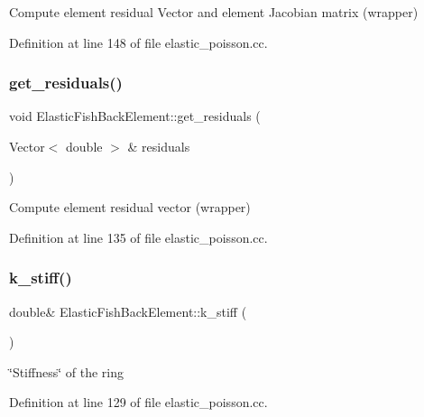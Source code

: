 Compute element residual Vector and element Jacobian matrix (wrapper) 



Definition at line 148 of file elastic\+\_\+poisson.\+cc.

\mbox{\label{classElasticFishBackElement_aed5858c2ae86823017713d0894cc4052}} 
\subsubsection{\texorpdfstring{get\+\_\+residuals()}{get\_residuals()}}
{\footnotesize\ttfamily void Elastic\+Fish\+Back\+Element\+::get\+\_\+residuals (\begin{DoxyParamCaption}\item[{Vector$<$ double $>$ \&}]{residuals }\end{DoxyParamCaption})\hspace{0.3cm}{\ttfamily [inline]}}



Compute element residual vector (wrapper) 



Definition at line 135 of file elastic\+\_\+poisson.\+cc.

\mbox{\label{classElasticFishBackElement_af0e376da1420c97403549b3a48f8b356}} 
\subsubsection{\texorpdfstring{k\+\_\+stiff()}{k\_stiff()}}
{\footnotesize\ttfamily double\& Elastic\+Fish\+Back\+Element\+::k\+\_\+stiff (\begin{DoxyParamCaption}{ }\end{DoxyParamCaption})\hspace{0.3cm}{\ttfamily [inline]}}



\char`\"{}\+Stiffness\char`\"{} of the ring 



Definition at line 129 of file elastic\+\_\+poisson.\+cc.

